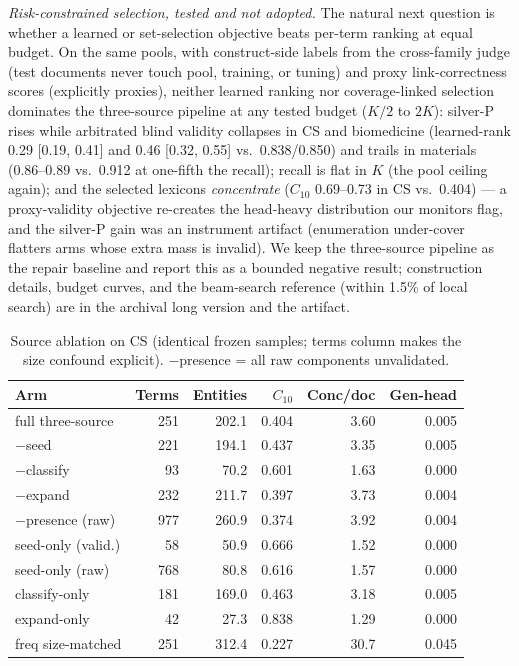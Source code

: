 \documentclass[sigconf,nonacm,anonymous]{acmart}
\begin{document}
\emph{Risk-constrained selection, tested and not adopted.} The
natural next question is whether a learned or set-selection objective
beats per-term ranking at equal budget. On the same pools, with
construct-side labels from the cross-family judge (test documents
never touch pool, training, or tuning) and proxy link-correctness
scores (explicitly proxies), neither learned ranking nor
coverage-linked selection dominates the three-source pipeline at any
tested budget ($K/2$ to $2K$): silver-P rises while arbitrated blind
validity collapses in CS and biomedicine (learned-rank 0.29 [0.19,
0.41] and 0.46 [0.32, 0.55] vs.\ 0.838/0.850) and trails in
materials (0.86--0.89 vs.\ 0.912 at one-fifth the recall); recall is
flat in $K$ (the pool ceiling again); and the selected lexicons
\emph{concentrate} ($C_{10}$ 0.69--0.73 in CS vs.\ 0.404) --- a
proxy-validity objective re-creates the head-heavy distribution our
monitors flag, and the silver-P gain was an instrument artifact
(enumeration under-cover flatters arms whose extra mass is invalid).
We keep the three-source pipeline as the repair baseline and report
this as a bounded negative result; construction details, budget
curves, and the beam-search reference (within 1.5\% of local search)
are in the archival long version and the artifact.
\begin{table}[t]
\centering
\caption{Source ablation on CS (identical frozen samples; terms column
makes the size confound explicit). $-$presence = all raw components
unvalidated.}
\label{tab:xdablate}
\footnotesize
\begin{tabular}{@{}lrrrrr@{}}
\toprule
Arm & Terms & Entities & $C_{10}$ & Conc/doc & Gen-head \\
\midrule
full three-source & 251 & 202.1 & 0.404 & 3.60 & 0.005 \\
$-$seed & 221 & 194.1 & 0.437 & 3.35 & 0.005 \\
$-$classify & 93 & 70.2 & 0.601 & 1.63 & 0.000 \\
$-$expand & 232 & 211.7 & 0.397 & 3.73 & 0.004 \\
$-$presence (raw) & 977 & 260.9 & 0.374 & 3.92 & 0.004 \\
seed-only (valid.) & 58 & 50.9 & 0.666 & 1.52 & 0.000 \\
seed-only (raw) & 768 & 80.8 & 0.616 & 1.57 & 0.000 \\
classify-only & 181 & 169.0 & 0.463 & 3.18 & 0.005 \\
expand-only & 42 & 27.3 & 0.838 & 1.29 & 0.000 \\
freq size-matched & 251 & 312.4 & 0.227 & 30.7 & 0.045 \\
\bottomrule
\end{tabular}
\end{table}
\end{document}
